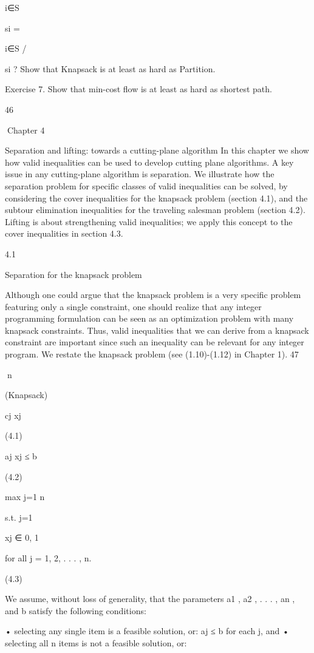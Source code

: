 \documentclass[titlepage]{book}
\theoremstyle{plain}
\theoremstyle{definition}
\theoremstyle{remark}
\begin{document}
i∈S

si =

i∈S
/

si ? Show that Knapsack is at least as hard as Partition.

Exercise 7. Show that min-cost flow is at least as hard as shortest path.

46

Chapter 4

Separation and lifting: towards a
cutting-plane algorithm
In this chapter we show how valid inequalities can be used to develop cutting plane algorithms. A key
issue in any cutting-plane algorithm is separation. We illustrate how the separation problem for specific classes of valid inequalities can be solved, by considering the cover inequalities for the knapsack
problem (section 4.1), and the subtour elimination inequalities for the traveling salesman problem (section 4.2). Lifting is about strengthening valid inequalities; we apply this concept to the cover inequalities
in section 4.3.

4.1

Separation for the knapsack problem

Although one could argue that the knapsack problem is a very specific problem featuring only a single
constraint, one should realize that any integer programming formulation can be seen as an optimization
problem with many knapsack constraints. Thus, valid inequalities that we can derive from a knapsack
constraint are important since such an inequality can be relevant for any integer program.
We restate the knapsack problem (see (1.10)-(1.12) in Chapter 1).
47

n

(Knapsack)

cj xj

(4.1)

aj xj ≤ b

(4.2)

max
j=1
n

s.t.
j=1

xj ∈ {0, 1}

for all j = 1, 2, . . . , n.

(4.3)

We assume, without loss of generality, that the parameters a1 , a2 , . . . , an , and b satisfy the following
conditions:

• selecting any single item is a feasible solution, or: aj ≤ b for each j, and
• selecting all n items is not a feasible solution, or:
\end{document}

